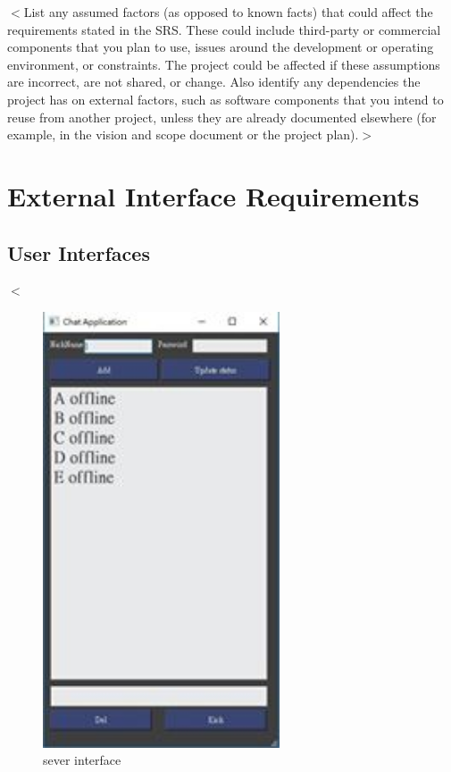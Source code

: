 \documentclass{scrreprt}
\begin{document}
\begin{CJK}{UTF8}{bkai}
$<$List any assumed factors (as opposed to known facts) that could affect the 
requirements stated in the SRS. These could include third-party or commercial 
components that you plan to use, issues around the development or operating 
environment, or constraints. The project could be affected if these assumptions 
are incorrect, are not shared, or change. Also identify any dependencies the 
project has on external factors, such as software components that you intend to 
reuse from another project, unless they are already documented elsewhere (for 
example, in the vision and scope document or the project plan).$>$
\fi　　　%

\chapter{External Interface Requirements}

\section{User Interfaces}
$<$

\begin{figure}[h]
\begin{center}
\includegraphics[width=7cm]{interface3.jpg}
\end{center}
\caption{sever interface}
\label{fig:2}
\end{figure}


\end{CJK}
\end{document}
